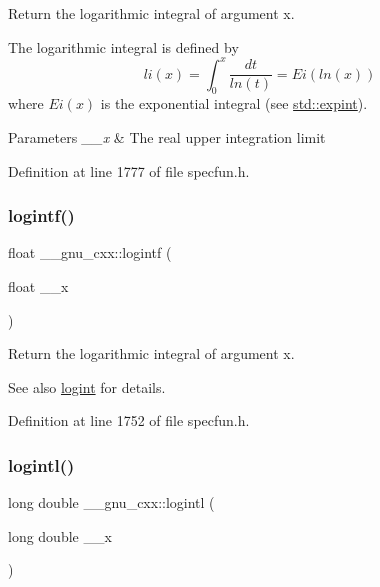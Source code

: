 Return the logarithmic integral of argument {\ttfamily x}.

The logarithmic integral is defined by \[ li(x) = \int_0^x \frac{dt}{ln(t)} = Ei(ln(x)) \] where $ Ei(x) $ is the exponential integral (see \hyperlink{group__mathsf__std_ga0e9ac717a106ef54184b5f058c451782}{std\+::expint}).


\begin{DoxyParams}{Parameters}
{\em \+\_\+\+\_\+x} & The real upper integration limit \\
\hline
\end{DoxyParams}


Definition at line 1777 of file specfun.\+h.

\mbox{\label{group__mathsf__gnu_gab878da3ba2f5c1d49d96eadde533b233}} 
\subsubsection{\texorpdfstring{logintf()}{logintf()}}
{\footnotesize\ttfamily float \+\_\+\+\_\+gnu\+\_\+cxx\+::logintf (\begin{DoxyParamCaption}\item[{float}]{\+\_\+\+\_\+x }\end{DoxyParamCaption})\hspace{0.3cm}{\ttfamily [inline]}}

Return the logarithmic integral of argument {\ttfamily x}.

\begin{DoxySeeAlso}{See also}
\hyperlink{group__mathsf__gnu_ga1c0fe0f4cb72041f24db82dc7e47df11}{logint} for details. 
\end{DoxySeeAlso}


Definition at line 1752 of file specfun.\+h.

\mbox{\label{group__mathsf__gnu_gab17f5cadc8f77ba2666d0d5ecc78de5d}} 
\subsubsection{\texorpdfstring{logintl()}{logintl()}}
{\footnotesize\ttfamily long double \+\_\+\+\_\+gnu\+\_\+cxx\+::logintl (\begin{DoxyParamCaption}\item[{long double}]{\+\_\+\+\_\+x }\end{DoxyParamCaption})\hspace{0.3cm}{\ttfamily [inline]}}

